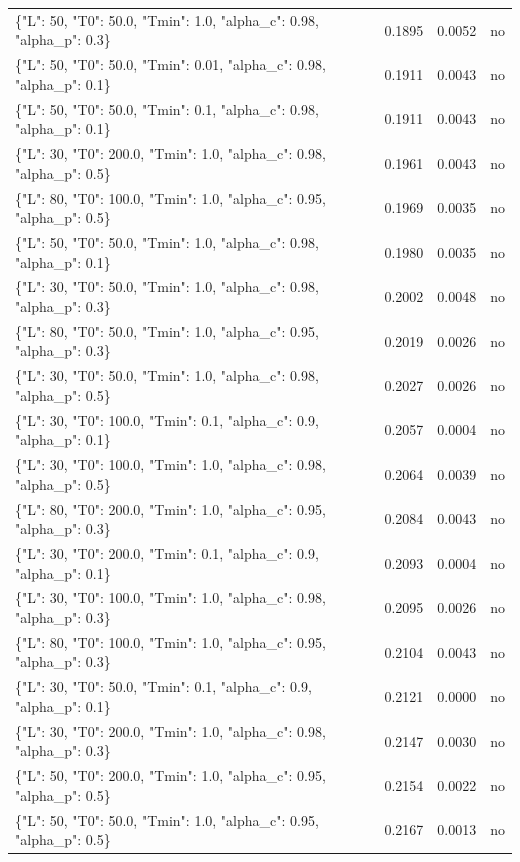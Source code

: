 \begin{table}[htbp]
\begin{tabular}{lrrr}
\{"L": 50, "T0": 50.0, "Tmin": 1.0, "alpha\_c": 0.98, "alpha\_p": 0.3\} & 0.1895 & 0.0052 & no \\
\{"L": 50, "T0": 50.0, "Tmin": 0.01, "alpha\_c": 0.98, "alpha\_p": 0.1\} & 0.1911 & 0.0043 & no \\
\{"L": 50, "T0": 50.0, "Tmin": 0.1, "alpha\_c": 0.98, "alpha\_p": 0.1\} & 0.1911 & 0.0043 & no \\
\{"L": 30, "T0": 200.0, "Tmin": 1.0, "alpha\_c": 0.98, "alpha\_p": 0.5\} & 0.1961 & 0.0043 & no \\
\{"L": 80, "T0": 100.0, "Tmin": 1.0, "alpha\_c": 0.95, "alpha\_p": 0.5\} & 0.1969 & 0.0035 & no \\
\{"L": 50, "T0": 50.0, "Tmin": 1.0, "alpha\_c": 0.98, "alpha\_p": 0.1\} & 0.1980 & 0.0035 & no \\
\{"L": 30, "T0": 50.0, "Tmin": 1.0, "alpha\_c": 0.98, "alpha\_p": 0.3\} & 0.2002 & 0.0048 & no \\
\{"L": 80, "T0": 50.0, "Tmin": 1.0, "alpha\_c": 0.95, "alpha\_p": 0.3\} & 0.2019 & 0.0026 & no \\
\{"L": 30, "T0": 50.0, "Tmin": 1.0, "alpha\_c": 0.98, "alpha\_p": 0.5\} & 0.2027 & 0.0026 & no \\
\{"L": 30, "T0": 100.0, "Tmin": 0.1, "alpha\_c": 0.9, "alpha\_p": 0.1\} & 0.2057 & 0.0004 & no \\
\{"L": 30, "T0": 100.0, "Tmin": 1.0, "alpha\_c": 0.98, "alpha\_p": 0.5\} & 0.2064 & 0.0039 & no \\
\{"L": 80, "T0": 200.0, "Tmin": 1.0, "alpha\_c": 0.95, "alpha\_p": 0.3\} & 0.2084 & 0.0043 & no \\
\{"L": 30, "T0": 200.0, "Tmin": 0.1, "alpha\_c": 0.9, "alpha\_p": 0.1\} & 0.2093 & 0.0004 & no \\
\{"L": 30, "T0": 100.0, "Tmin": 1.0, "alpha\_c": 0.98, "alpha\_p": 0.3\} & 0.2095 & 0.0026 & no \\
\{"L": 80, "T0": 100.0, "Tmin": 1.0, "alpha\_c": 0.95, "alpha\_p": 0.3\} & 0.2104 & 0.0043 & no \\
\{"L": 30, "T0": 50.0, "Tmin": 0.1, "alpha\_c": 0.9, "alpha\_p": 0.1\} & 0.2121 & 0.0000 & no \\
\{"L": 30, "T0": 200.0, "Tmin": 1.0, "alpha\_c": 0.98, "alpha\_p": 0.3\} & 0.2147 & 0.0030 & no \\
\{"L": 50, "T0": 200.0, "Tmin": 1.0, "alpha\_c": 0.95, "alpha\_p": 0.5\} & 0.2154 & 0.0022 & no \\
\{"L": 50, "T0": 50.0, "Tmin": 1.0, "alpha\_c": 0.95, "alpha\_p": 0.5\} & 0.2167 & 0.0013 & no \\

\end{tabular}
\end{table}
